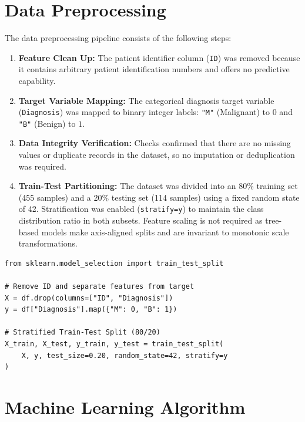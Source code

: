 \documentclass[12pt,a4paper]{article}
\begin{document}
\section{Data Preprocessing}
The data preprocessing pipeline consists of the following steps:
\begin{enumerate}
    \item \textbf{Feature Clean Up:} The patient identifier column (\texttt{ID}) was removed because it contains arbitrary patient identification numbers and offers no predictive capability.
    \item \textbf{Target Variable Mapping:} The categorical diagnosis target variable (\texttt{Diagnosis}) was mapped to binary integer labels: \texttt{"M"} (Malignant) to $0$ and \texttt{"B"} (Benign) to $1$.
    \item \textbf{Data Integrity Verification:} Checks confirmed that there are no missing values or duplicate records in the dataset, so no imputation or deduplication was required.
    \item \textbf{Train-Test Partitioning:} The dataset was divided into an 80\% training set (455 samples) and a 20\% testing set (114 samples) using a fixed random state of 42. Stratification was enabled (\texttt{stratify=y}) to maintain the class distribution ratio in both subsets. Feature scaling is not required as tree-based models make axis-aligned splits and are invariant to monotonic scale transformations.
\end{enumerate}

\begin{lstlisting}[caption={Dataset Partitioning and Stratification Code}]
from sklearn.model_selection import train_test_split

# Remove ID and separate features from target
X = df.drop(columns=["ID", "Diagnosis"])
y = df["Diagnosis"].map({"M": 0, "B": 1})

# Stratified Train-Test Split (80/20)
X_train, X_test, y_train, y_test = train_test_split(
    X, y, test_size=0.20, random_state=42, stratify=y
)
\end{lstlisting}

\section{Machine Learning Algorithm}
\end{document}
